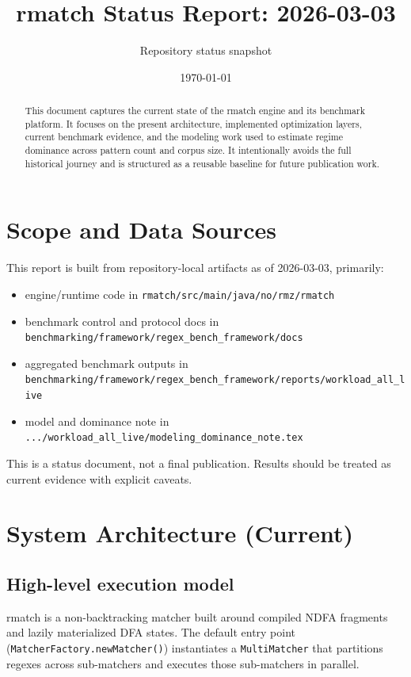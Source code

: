 \documentclass[11pt]{article}
\title{rmatch Status Report: 2026-03-03}
\author{Repository status snapshot}
\date{\today}
\begin{document}
\maketitle

\begin{abstract}
This document captures the current state of the rmatch engine and its benchmark platform. It focuses on the present architecture, implemented optimization layers, current benchmark evidence, and the modeling work used to estimate regime dominance across pattern count and corpus size. It intentionally avoids the full historical journey and is structured as a reusable baseline for future publication work.
\end{abstract}

\tableofcontents

\section{Scope and Data Sources}
This report is built from repository-local artifacts as of 2026-03-03, primarily:
\begin{itemize}
  \item engine/runtime code in \texttt{rmatch/src/main/java/no/rmz/rmatch}
  \item benchmark control and protocol docs in \texttt{benchmarking/framework/regex\_bench\_framework/docs}
  \item aggregated benchmark outputs in \texttt{benchmarking/framework/regex\_bench\_framework/reports/workload\_all\_live}
  \item model and dominance note in \texttt{.../workload\_all\_live/modeling\_dominance\_note.tex}
\end{itemize}

This is a status document, not a final publication. Results should be treated as current evidence with explicit caveats.

\section{System Architecture (Current)}
\subsection{High-level execution model}
rmatch is a non-backtracking matcher built around compiled NDFA fragments and lazily materialized DFA states. The default entry point (\texttt{MatcherFactory.newMatcher()}) instantiates a \texttt{MultiMatcher} that partitions regexes across sub-matchers and executes those sub-matchers in parallel.
\end{document}
